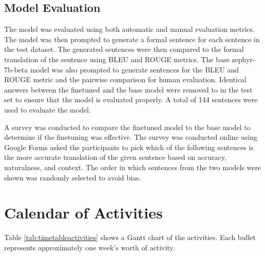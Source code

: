 \subsection{Model Evaluation}
The model was evaluated using both automatic and manual evaluation metrics. The model was then prompted to generate a formal sentence for each sentence in the test dataset. The generated sentences were then compared to the formal translation of the sentence using BLEU and ROUGE metrics. The base zephyr-7b-beta model was also prompted to generate sentences for the BLEU and ROUGE metric and the pairwise comparison for human evaluation. Identical answers between the finetuned and the base model were removed to in the test set to ensure that the model is evaluated properly. A total of 144 sentences were used to evaluate the model.

A survey was conducted to compare the finetuned model to the base model to determine if the finetuning was effective. The survey was conducted online using Google Forms asked the participants to pick which of the following sentences is the more accurate translation of the given sentence based on accuracy, naturalness, and context. The order in which sentences from the two models were shown was randomly selected to avoid bias.


\section{Calendar of Activities}

	Table \ref{tab:timetableactivities} shows a Gantt chart of the activities.  Each bullet represents approximately
	one week's worth of activity.
	
	\newcommand{\weekone}{\textbullet}
	\newcommand{\weektwo}{\textbullet \textbullet}
	\newcommand{\weekthree}{\textbullet \textbullet \textbullet}
	\newcommand{\weekfour}{\textbullet \textbullet \textbullet \textbullet}
	
